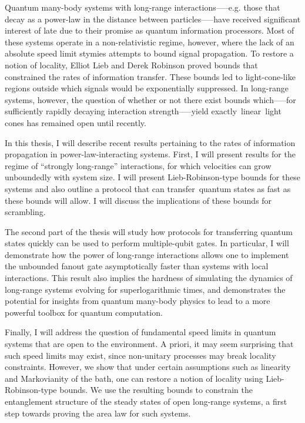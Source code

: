 Quantum many-body systems with long-range interactions--—e.g. those that decay as a power-law in the distance between particles—--have received significant interest of late due to their promise as quantum information processors. Most of these systems operate in a non-relativistic regime, however, where the lack of an absolute speed limit stymies attempts to bound signal propagation. To restore a notion of locality, Elliot Lieb and Derek Robinson proved bounds that constrained the rates of information transfer. These bounds led to light-cone-like regions outside which signals would be exponentially suppressed. In long-range systems, however, the question of whether or not there exist bounds which--—for sufficiently rapidly decaying interaction strength—--yield exactly linear light cones has remained open until recently. 

In this thesis, I will describe recent results pertaining to the rates of information propagation in power-law-interacting systems. First, I will present results for the regime of ``strongly long-range'' interactions, for which velocities can grow unboundedly with system size. I will present Lieb-Robinson-type bounds for these systems and also outline a protocol that can transfer quantum states as fast as these bounds will allow. I will discuss the implications of these bounds for scrambling.

The second part of the thesis will study how protocols for transferring quantum states quickly can be used to perform multiple-qubit gates. In particular, I will demonstrate how the power of long-range interactions allows one to implement the unbounded fanout gate asymptotically faster than systems with local interactions. This result also implies the hardness of simulating the dynamics of long-range systems evolving for superlogarithmic times, and demonstrates the potential for insights from quantum many-body physics to lead to a more powerful toolbox for quantum computation.

Finally, I will address the question of fundamental speed limits in quantum systems that are open to the environment. A priori, it may seem surprising that such speed limits may exist, since non-unitary processes may break locality constraints. However, we show that under certain assumptions such as linearity and Markovianity of the bath, one can restore a notion of locality using Lieb-Robinson-type bounds. We use the resulting bounds to constrain the entanglement structure of the steady states of open long-range systems, a first step towards proving the area law for such systems. 
